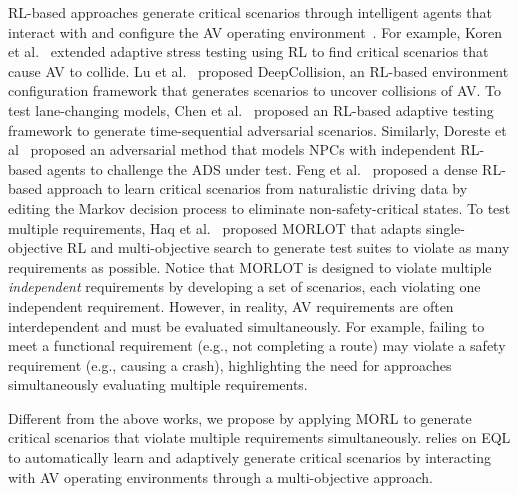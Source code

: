 RL-based approaches generate critical scenarios through intelligent agents that interact with and configure the AV operating environment~\cite{chen2021adversarial,lu2022learning,10172658,feng2023dense}. For example, 
Koren et al.~\cite{8500400} extended adaptive stress testing using RL to find critical scenarios that cause AV to collide.
Lu et al.~\cite{lu2022learning} proposed DeepCollision, an RL-based environment configuration framework that generates scenarios to uncover collisions of AV. To test lane-changing models, Chen et al.~\cite{chen2021adversarial} proposed an RL-based adaptive testing framework to generate time-sequential adversarial scenarios. Similarly, Doreste et al~\cite{doreste2024adversarial} proposed an adversarial method that models NPCs with independent RL-based agents to challenge the ADS under test. Feng et al.~\cite{feng2023dense} proposed a dense RL-based approach to learn critical scenarios from naturalistic driving data by editing the Markov decision process to eliminate non-safety-critical states. 
To test multiple requirements, Haq et al.~\cite{10172658} proposed MORLOT that adapts single-objective RL and multi-objective search to generate test suites to violate as many requirements as possible. Notice that MORLOT is designed to violate multiple \textit{independent} requirements by developing a set of scenarios, each violating one independent requirement. However, in reality, AV requirements are often interdependent and must be evaluated simultaneously.
For example, failing to meet a functional requirement (e.g., not completing a route) may violate a safety requirement (e.g., causing a crash), highlighting the need for approaches simultaneously evaluating multiple requirements. 

Different from the above works, we propose \method by applying MORL to generate critical scenarios that violate multiple requirements simultaneously. \method relies on EQL to automatically learn and adaptively generate critical scenarios by interacting with AV operating environments through a multi-objective approach.